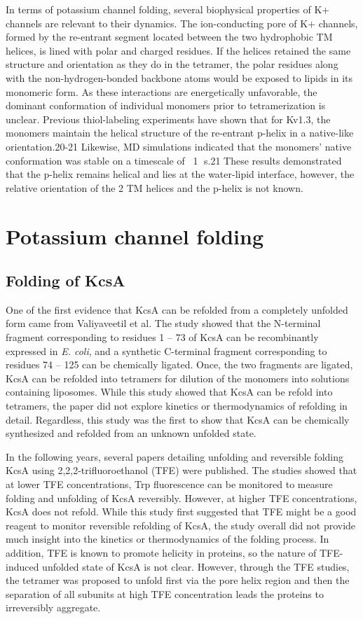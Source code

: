 In terms of potassium channel folding, several biophysical properties of K+ channels are relevant to their dynamics. The ion-conducting pore of K+ channels, formed by the re-entrant segment located between the two hydrophobic TM helices, is lined with polar and charged residues. If the helices retained the same structure and orientation as they do in the tetramer, the polar residues along with the non-hydrogen-bonded backbone atoms would be exposed to lipids in its monomeric form. As these interactions are energetically unfavorable, the dominant conformation of individual monomers prior to tetramerization is unclear. Previous thiol-labeling experiments have shown that for Kv1.3, the monomers maintain the helical structure of the re-entrant p-helix in a native-like orientation.20-21 Likewise, MD simulations indicated that the monomers’ native conformation was stable on a timescale of ~1 s.21 These results demonstrated that the p-helix remains helical and lies at the water-lipid interface, however, the relative orientation of the 2 TM helices and the p-helix is not known.
 
\section{Potassium channel folding}
\subsection{Folding of KcsA}
One of the first evidence that KcsA can be refolded from a completely unfolded form came from Valiyaveetil et al. \citep{valiyaveetil2002semi} The study showed that the N-terminal fragment corresponding to residues 1 -- 73 of KcsA can be recombinantly expressed in \textit{E. coli}, and a synthetic C-terminal fragment corresponding to residues 74 -- 125 can be chemically ligated. Once, the two fragments are ligated, KcsA can be refolded into tetramers for dilution of the monomers into solutions containing liposomes. While this study showed that KcsA can be refold into tetramers, the paper did not explore kinetics or thermodynamics of refolding in detail. Regardless, this study was the first to show that KcsA can be chemically synthesized and refolded from an unknown unfolded state.

In the following years, several papers detailing unfolding and reversible folding KcsA using 2,2,2-trifluoroethanol (TFE) were published. \citep{molina2004, barrera2005, barrera2008} The studies showed that at lower TFE concentrations, Trp fluorescence can be monitored to measure folding and unfolding of KcsA reversibly. However, at higher TFE concentrations, KcsA does not refold. While this study first suggested that TFE might be a good reagent to monitor reversible refolding of KcsA, the study overall did not provide much insight into the kinetics or thermodynamics of the folding process. In addition, TFE is known to promote helicity in proteins, so the nature of TFE-induced unfolded state of KcsA is not clear. However, through the TFE studies, the tetramer was proposed to unfold first via the pore helix region and then the separation of all subunits at high TFE concentration leads the proteins to irreversibly aggregate.

